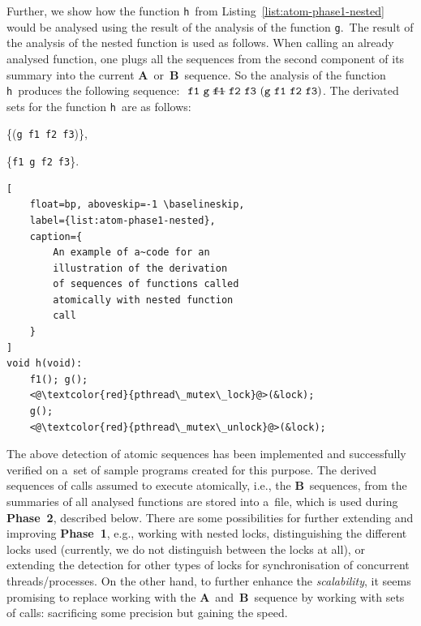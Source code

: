 \documentclass{ExcelAtFIT}
\begin{document}
Further, we show how the function
\texttt{h}~from Listing~\ref{list:atom-phase1-nested}
would be analysed using the result of the analysis of
the function \texttt{g}.~The result of the analysis
of the nested function is used as follows. When calling
an already analysed function, one plugs all the sequences
from the second component of its summary into the current
\textbf{A}~or~\textbf{B}~sequence.
So the analysis of the function
\texttt{h}~produces the following sequence:
$
    \text{
        \texttt{f1} \texttt{g} \sout{\texttt{f1}}
        \texttt{f2} \texttt{f3}
    }
    (\text{%
        \texttt{g} \texttt{f1} \texttt{f2}
        \texttt{f3}%
    })
$.
The derivated sets for the
function \texttt{h}~are as follows:
\begin{enumerate*}[label={(\roman*)}, topsep=0.4em]
    \item
        \{(\texttt{g}~\texttt{f1}~\texttt{f2}~\texttt{f3})\},

    \item
        \{\texttt{f1}~\texttt{g}~\texttt{f2}~\texttt{f3}\}.
\end{enumerate*}

\begin{lstlisting}[
    float=bp, aboveskip=-1 \baselineskip,
    label={list:atom-phase1-nested},
    caption={
        An example of a~code for an
        illustration of the derivation
        of sequences of functions called
        atomically with nested function
        call
    }
]
void h(void):
    f1(); g();
    <@\textcolor{red}{pthread\_mutex\_lock}@>(&lock);
    g();
    <@\textcolor{red}{pthread\_mutex\_unlock}@>(&lock);
\end{lstlisting}

The above detection of atomic sequences
has been implemented and successfully verified
on a~set of sample programs created for
this purpose. The derived sequences of calls
assumed to execute atomically, i.e.,
the \textbf{B}~sequences, from the summaries
of all analysed functions are stored into a~file,
which is used during \textbf{Phase~2},
described below. There are some
possibilities for further extending and
improving \textbf{Phase~1}, e.g.,
working with nested locks, distinguishing the
different locks used (currently, we do not
distinguish between the locks at all),
or extending the detection for other types of
locks for synchronisation of concurrent
threads/processes. On the other hand,
to further enhance the \emph{scalability},
it seems promising to replace working with
the \textbf{A}~and~\textbf{B}~sequence
by working with sets of calls: sacrificing
some precision but gaining the speed.
\end{document}
